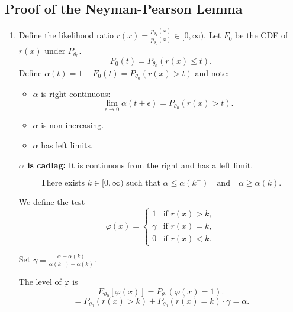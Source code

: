 \documentclass[open=any, 11pt,paper=A4]{scrreprt}
\begin{document}
\subsection{Proof of the Neyman-Pearson Lemma}
\begin{enumerate}
    \item Define the likelihood ratio \( r(x) = \frac{p_{\theta_1}(x)}{p_{\theta_0}(x)} \in [0, \infty) \). Let \( F_0 \) be the CDF of \( r(x) \) under \( P_{\theta_0} \).
    \[
    F_0(t) = P_{\theta_0} (r(x) \leq t).
    \]
    Define \( \alpha(t) = 1 - F_0(t) = P_{\theta_0} (r(x) > t) \) and note:
    \begin{itemize}
        \item \( \alpha \) is right-continuous:
        \[
        \lim_{\epsilon \to 0} \alpha(t + \epsilon) = P_{\theta_0} (r(x) > t).
        \]
        \item \( \alpha \) is non-increasing.
        \item \( \alpha \) has left limits.
    \end{itemize}

    \textbf{\( \alpha \) is cadlag:} It is continuous from the right and has a left limit.

    \[
    \text{There exists } k \in [0, \infty) \text{ such that }
    \alpha \leq \alpha(k^-) \quad \text{and} \quad \alpha \geq \alpha(k).
    \]

    We define the test
    \[
    \varphi(x) = 
    \begin{cases} 
      1 & \text{if } r(x) > k, \\
      \gamma & \text{if } r(x) = k, \\
      0 & \text{if } r(x) < k.
    \end{cases}
    \]
    
    Set \(\gamma = \frac{\alpha - \alpha(k)}{\alpha(k^-) - \alpha(k)}\).

    The level of \( \varphi \) is
    \[
    E_{\theta_0} [\varphi(x)] = P_{\theta_0} (\varphi(x) = 1).
    \]
    \[
    = P_{\theta_0} (r(x) > k) + P_{\theta_0} (r(x) = k) \cdot \gamma = \alpha.
    \]
\end{enumerate}
\end{document}

